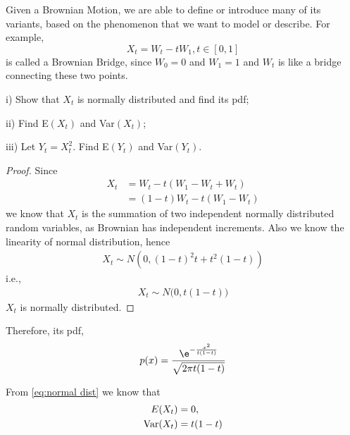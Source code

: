     \problem
    \begin{question}
        Given a Brownian Motion, we are able to define or introduce many
        of its variants, based on the phenomenon that we want to model or 
        describe.  For example,
        \[X_t=W_t-tW_1, t\in[0,1]\]
        is called a Brownian Bridge, since $W_0=0$ and $W_1=1$ and $W_t$ is 
        like a bridge connecting these two points.

        \noindent i)  Show that $X_t$ is normally distributed and find its pdf;

        \noindent ii)  Find E$(X_t)$ and Var$(X_t)$;

        \noindent iii) Let $Y_t=X_t^2$.  Find E$(Y_t)$ and Var$(Y_t)$.
    \end{question}
    \begin{subproblem}
        \item
        \begin{proof}
            Since
            \[\begin{aligned}
                X_t&=W_t-t(W_1-W_t+W_t)\\
                   &=(1-t)W_t-t(W_1-W_t) 
            \end{aligned}\]
            we know that $X_t$ is the summation of two
            independent normally distributed random variables,
            as Brownian has independent increments. Also we know
            the linearity of normal distribution, hence
            \begin{equation*}
                \begin{aligned}
                X_t\sim N\left(0,(1-t)^2t+t^2(1-t)\right)
                \end{aligned}
            \end{equation*}
            i.e.,
            \begin{equation}
                \label{eq:normal dist}
                \begin{aligned}
                X_t\sim N\big(0,t(1-t)\big)
                \end{aligned}
            \end{equation}
            $X_t$ is normally distributed.
        \end{proof}

        Therefore, its pdf,
        \[p(x)=\frac{\e^{-\frac{x^2}{t(1-t)}}}{\sqrt{2\pi t(1-t)}}\]

        \item
        From \cref{eq:normal dist} we know that
        \begin{align*}
            E(X_t)&=0,\\
            \mathrm{Var}(X_t)&=t(1-t)
        \end{align*}


\end{subproblem}
